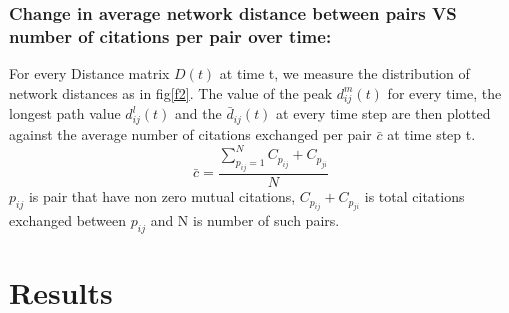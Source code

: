 \documentclass[aps, pre, twocolumn, nofootinbib]{revtex4-1}
\begin{document}
\subsubsection{Change in average network distance between pairs VS number of citations per pair over time:}
For every Distance matrix $D(t)$ at time t, we measure the distribution of network distances as in fig\ref{f2}. The value of the peak $d^m_{ij}(t)$ for every time, the longest path value $d^l_{ij}(t)$ and the $\bar{d}_{ij}(t)$ at every time step are then plotted against the average number of citations exchanged per pair $\bar{c}$ at time step t.
\begin{equation}
\bar{c} = \frac{\sum_{p_{ij}=1}^{N} C_{p_{ij}} + C_{p_{ji}}}{N} 
\end{equation}
$p_{ij}$ is pair that have non zero mutual citations, $C_{p_{ij}} + C_{p_{ji}}$ is total citations exchanged between $p_{ij}$ and N is number of such pairs.
\section{Results}
\end{document}
